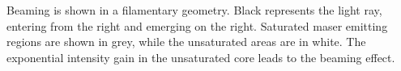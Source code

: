 \label{fig:geometry} Beaming is shown in a filamentary geometry. Black represents the light ray, entering from the right and emerging on the right. Saturated maser emitting regions are shown in grey, while the unsaturated areas are in white. The exponential intensity gain in the unsaturated core leads to the beaming effect.